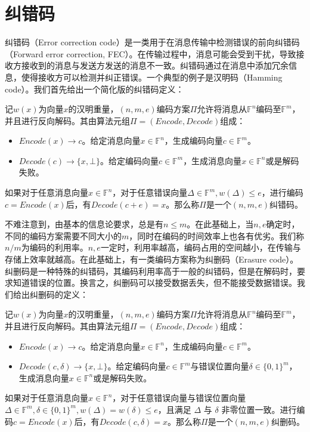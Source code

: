 \section{纠错码}
纠错码（Error correction code）是一类用于在消息传输中检测错误的前向纠错码（Forward error correction, FEC）。在传输过程中，消息可能会受到干扰，导致接收方接收到的消息与发送方发送的消息不一致。纠错码通过在消息中添加冗余信息，使得接收方可以检测并纠正错误。一个典型的例子是汉明码（Hamming code）。我们首先给出一个简化版的纠错码定义：

\begin{definition}[纠错码]
    记$w(x)$为向量$x$的汉明重量，$(n,m,e)$编码方案$\Pi$允许将消息从$\mathbb{F}^n$编码至$\mathbb{F}^m$，并且进行反向解码。其由算法元组$\Pi = (Encode, Decode)$组成：
    \begin{itemize}
        \item $Encode(x) \rightarrow c$。给定消息向量$x\in \mathbb{F}^n$，生成编码向量$c\in \mathbb{F}^m$。
        \item $Decode(c) \rightarrow \{x,\bot\}$。给定编码向量$c\in \mathbb{F}^m$，生成消息向量$x\in \mathbb{F}^n$或是解码失败。 
    \end{itemize}
    如果对于任意消息向量$x\in \mathbb{F}^n$，对于任意错误向量$\Delta\in \mathbb{F}^m, w(\Delta)\le e$，进行编码$c = Encode(x)$后，有$Decode(c+e) = x$。那么称$\Pi$是一个$(n,m,e)$纠错码。
\end{definition}

不难注意到，由基本的信息论要求，总是有$n\le m$。在此基础上，当$n,e$确定时，不同的编码方案需要不同大小的$m$，同时在编码的时间效率上也各有优劣。我们称$n/m$为编码的利用率。$n,e$一定时，利用率越高，编码占用的空间越小，在传输与存储上效率就越高。在此基础上，有一类编码方案称为纠删码（Erasure code）。纠删码是一种特殊的纠错码，其编码利用率高于一般的纠错码，但是在解码时，要求知道错误的位置。换言之，纠删码可以接受数据丢失，但不能接受数据错误。我们给出纠删码的定义：

\begin{definition}[纠删码]
    记$w(x)$为向量$x$的汉明重量，$(n,m,e)$编码方案$\Pi$允许将消息从$\mathbb{F}^n$编码至$\mathbb{F}^m$，并且进行反向解码。其由算法元组$\Pi = (Encode, Decode)$组成：
    \begin{itemize}
        \item $Encode(x) \rightarrow c$。给定消息向量$x\in \mathbb{F}^n$，生成编码向量$c\in \mathbb{F}^m$。
        \item $Decode(c, \delta) \rightarrow \{x,\bot\}$。给定编码向量$c\in \mathbb{F}^m$与错误位置向量$\delta\in \{0,1\}^m$，生成消息向量$x\in \mathbb{F}^n$或是解码失败。
    \end{itemize}
    如果对于任意消息向量$x\in \mathbb{F}^n$，对于任意错误向量与错误位置向量$\Delta\in \mathbb{F}^m, \delta\in \{0,1\}^m, w(\Delta)=w(\delta)\le e$，且满足 $\Delta$ 与 $\delta$ 非零位置一致。进行编码$c = Encode(x)$后，有$Decode(c, \delta) = x$。那么称$\Pi$是一个$(n,m,e)$纠删码。
\end{definition}

